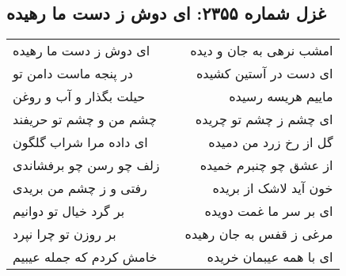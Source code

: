 \begin{center}
\section*{غزل شماره ۲۳۵۵: ای دوش ز دست ما رهیده}
\label{sec:2355}
\begin{longtable}{l p{0.5cm} r}
ای دوش ز دست ما رهیده
&&
امشب نرهی به جان و دیده
\\
در پنجه ماست دامن تو
&&
ای دست در آستین کشیده
\\
حیلت بگذار و آب و روغن
&&
ماییم هریسه رسیده
\\
چشم من و چشم تو حریفند
&&
ای چشم ز چشم تو چریده
\\
ای داده مرا شراب گلگون
&&
گل از رخ زرد من دمیده
\\
زلف چو رسن چو برفشاندی
&&
از عشق چو چنبرم خمیده
\\
رفتی و ز چشم من بریدی
&&
خون آید لاشک از بریده
\\
بر گرد خیال تو دوانیم
&&
ای بر سر ما غمت دویده
\\
بر روزن تو چرا نپرد
&&
مرغی ز قفس به جان رهیده
\\
خامش کردم که جمله عیبیم
&&
ای با همه عیبمان خریده
\\
\end{longtable}
\end{center}
